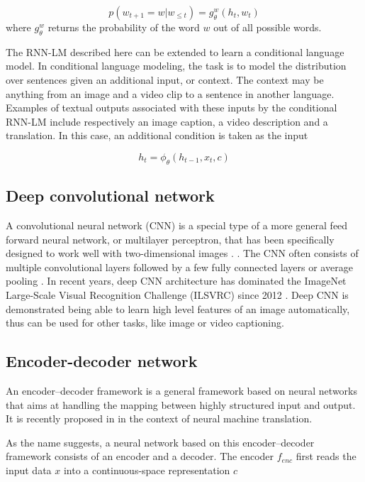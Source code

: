\begin{equation}
p(w_{t+1}=w|w_{\le t})=g_{\theta}^w(h_t,w_t)
\end{equation}
where $g_{\theta}^w$ returns the probability of the word $w$ out of all possible words.

The RNN-LM described here can be extended to learn a conditional language model. In conditional language modeling, the task is to model the distribution over sentences given an additional input, or context. The context may be anything from an image and a video clip to a sentence in another language. Examples of textual outputs associated with these inputs by the conditional RNN-LM include respectively an image caption, a video description and a translation. In this case, an additional condition is taken as the input

\begin{equation}
h_t=\phi_\theta(h_{t-1},x_t,c)
\end{equation}

\subsection{Deep convolutional network}
A convolutional neural network (CNN) is a special type of a more general feed forward neural network, or multilayer perceptron, that has been specifically designed to work well with two-dimensional images \cite{lecun1998gradient}. . The CNN often consists of multiple convolutional layers followed by a few fully connected layers or average pooling \cite{lin2013network,szegedy2015going}. In recent years, deep CNN architecture has dominated the ImageNet Large-Scale Visual Recognition Challenge (ILSVRC) since 2012 \cite{krizhevsky2012imagenet,simonyan2014very,szegedy2015going,he2015deep}. Deep CNN is demonstrated being able to learn high level features of an image automatically\cite{zeiler2014visualizing}, thus can be used for other tasks, like image or video captioning.

\subsection{Encoder-decoder network}
An encoder–decoder framework is a general framework based on neural networks that aims at handling the mapping between highly structured input and output. It is recently proposed in \cite{sutskever2014sequence,cho2014learning} in the context of neural machine translation.

As the name suggests, a neural network based on this encoder–decoder framework consists of an encoder and a decoder. The encoder $f_{enc}$ first reads the input data $x$ into a continuous-space representation $c$

